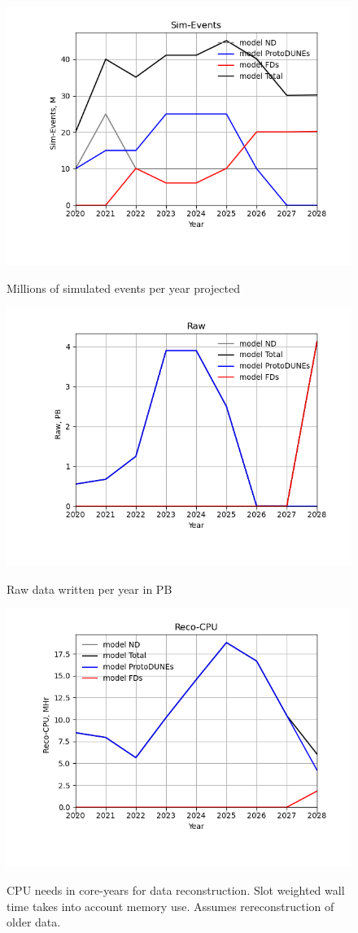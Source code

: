 \documentclass[12pt,landscape]{article}
\begin{document}
\begin{figure}[ht]
\centering\includegraphics[height=0.4\textwidth]{report/Parameters_2022-11-07-2028-Sim-Events.png}\label{Sim-Events}
\caption{Millions of simulated events per year projected}
\end{figure}
\begin{figure}[ht]
\centering\includegraphics[height=0.4\textwidth]{report/Parameters_2022-11-07-2028-Raw.png}\label{Raw}
\caption{Raw data written per year in PB}
\end{figure}
\begin{figure}[ht]
\centering\includegraphics[height=0.4\textwidth]{report/Parameters_2022-11-07-2028-Reco-CPU.png}\label{Reco-CPU}
\caption{CPU needs in core-years for data reconstruction.              Slot weighted wall time takes into account memory use.  Assumes rereconstruction of older data.}
\end{figure}
\end{document}
